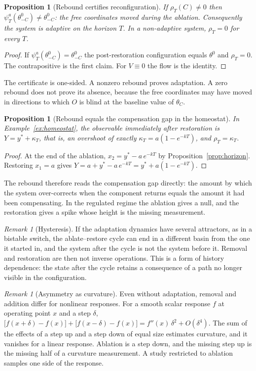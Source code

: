 \documentclass[11pt]{article}
\newtheorem{proposition}[theorem]{Proposition}
\theoremstyle{definition}
\theoremstyle{remark}
\newtheorem{remark}[theorem]{Remark}
\begin{document}
\begin{proposition}[Rebound certifies reconfiguration]\label{prop:rebound}
If $\rho_T(C)\ne0$ then $\psi^a_T(\theta^0_{-C})\ne\theta^0_{-C}$: the free coordinates moved during the ablation. Consequently the system is adaptive on the horizon $T$. In a non-adaptive system, $\rho_T=0$ for every $T$.
\end{proposition}
\begin{proof}
If $\psi^a_T(\theta^0_{-C})=\theta^0_{-C}$ the post-restoration configuration equals $\theta^0$ and $\rho_T=0$. The contrapositive is the first claim. For $V\equiv0$ the flow is the identity.
\end{proof}

The certificate is one-sided. A nonzero rebound proves adaptation. A zero rebound does not prove its absence, because the free coordinates may have moved in directions to which $O$ is blind at the baseline value of $\theta_C$.

\begin{proposition}[Rebound equals the compensation gap in the homeostat]\label{prop:reboundhomeo}
In Example~\ref{ex:homeostat}, the observable immediately after restoration is $Y=y^*+\kappa_T$, that is, an overshoot of exactly $\kappa_T=a(1-e^{-kT})$, and $\rho_T=\kappa_T$.
\end{proposition}
\begin{proof}
At the end of the ablation, $x_2=y^*-a\,e^{-kT}$ by Proposition~\ref{prop:horizon}. Restoring $x_1=a$ gives $Y=a+y^*-a\,e^{-kT}=y^*+a(1-e^{-kT})$.
\end{proof}

The rebound therefore reads the compensation gap directly: the amount by which the system over-corrects when the component returns equals the amount it had been compensating. In the regulated regime the ablation gives a null, and the restoration gives a spike whose height is the missing measurement.

\begin{remark}[Hysteresis]
If the adaptation dynamics have several attractors, as in a bistable switch, the ablate--restore cycle can end in a different basin from the one it started in, and the system after the cycle is not the system before it. Removal and restoration are then not inverse operations. This is a form of history dependence: the state after the cycle retains a consequence of a path no longer visible in the configuration.
\end{remark}

\begin{remark}[Asymmetry as curvature]
Even without adaptation, removal and addition differ for nonlinear responses. For a smooth scalar response $f$ at operating point $x$ and a step $\delta$, $\bigl[f(x+\delta)-f(x)\bigr]+\bigl[f(x-\delta)-f(x)\bigr]=f''(x)\,\delta^2+O(\delta^4)$. The sum of the effects of a step up and a step down of equal size estimates curvature, and it vanishes for a linear response. Ablation is a step down, and the missing step up is the missing half of a curvature measurement. A study restricted to ablation samples one side of the response.
\end{remark}
\end{document}
